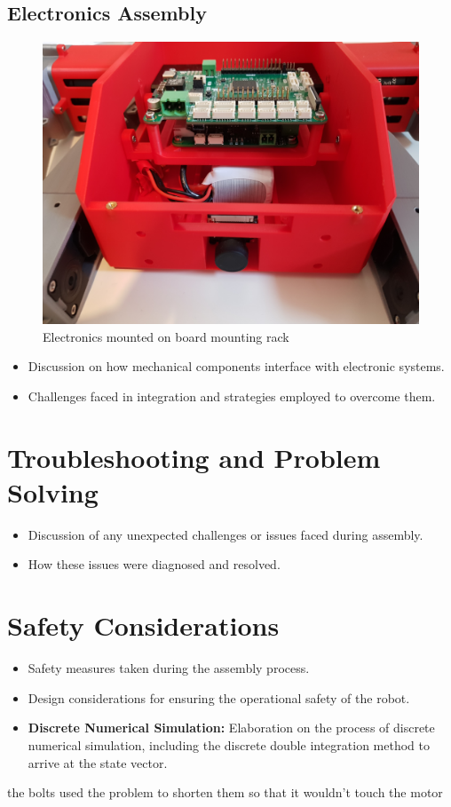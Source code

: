 \subsection{Electronics Assembly}
\begin{figure}[h]
	\centering
	\includegraphics[width=0.5\linewidth]{electronics_mounted_on_board_mounting_rack}
	\caption{Electronics mounted on board mounting rack}
	\label{fig:electronicsmountedonboardmountingrack}
\end{figure}
\begin{itemize}
\item Discussion on how mechanical components interface with electronic systems.
\item Challenges faced in integration and strategies employed to overcome them.
\end{itemize}

\section{Troubleshooting and Problem Solving}
\begin{itemize}
\item Discussion of any unexpected challenges or issues faced during assembly.
\item How these issues were diagnosed and resolved.
\end{itemize}
\section{Safety Considerations}
\begin{itemize}
	\item Safety measures taken during the assembly process.
	\item Design considerations for ensuring the operational safety of the robot.
\end{itemize}
\begin{itemize}
	\item \textbf{Discrete Numerical Simulation:} Elaboration on the process of discrete numerical simulation, including the discrete double integration method to arrive at the state vector.
\end{itemize}

\begin{notebox}
	the bolts used the problem to shorten them so that it wouldn't touch the motor 
\end{notebox}

